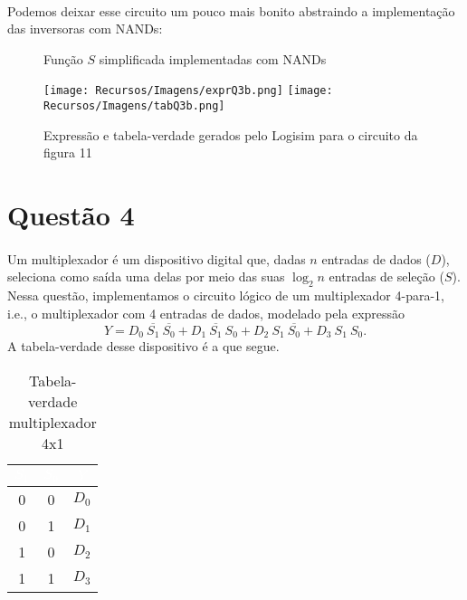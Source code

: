 \documentclass[a4paper, 12pt]{article}
\begin{document}
\paragraph{}
Podemos deixar esse circuito um pouco mais bonito abstraindo a implementação das inversoras com NANDs:

\begin{figure}[H]
    \centering
    
    \vspace{-30pt}
    \caption{Função $S$ simplificada implementadas com NANDs}
    \vspace{-10pt}
\end{figure}

\begin{figure}[H]
    \centering
    \texttt{[image: Recursos/Imagens/exprQ3b.png]}
    \texttt{[image: Recursos/Imagens/tabQ3b.png]} \\
    \caption{Expressão e tabela-verdade gerados pelo Logisim para o circuito da figura 11}
    \vspace{-20pt}
\end{figure}

\section{Questão 4}
\paragraph{}
Um multiplexador é um dispositivo digital que, dadas $n$ entradas de dados ($D$), seleciona como saída uma delas por meio das suas $\log_2n$ entradas de seleção ($S$). Nessa questão, implementamos o circuito lógico de um multiplexador 4-para-1, i.e., o multiplexador com 4 entradas de dados, modelado pela expressão
\[
Y = D_0 \ \overline{S_1} \ \overline{S_0} + D_1 \ \overline{S_1} \ S_0 + D_2 \ S_1 \ \overline{S_0} + D_3 \ S_1 \ S_0.
\]
A tabela-verdade desse dispositivo é a que segue.

\begin{table}[H]
    \centering
    \begin{tabular}{|c|c|c|}
        \hline
        \rowcolor{black}
        \textcolor{white}{$S_1$} & \textcolor{white}{$S_0$} & \textcolor{white}{$Y$} \\ \hline
        0 & 0 & $D_0$ \\ \hline
        \rowcolor{lightgray}
        0 & 1 & $D_1$ \\ \hline
        1 & 0 & $D_2$ \\ \hline
        \rowcolor{lightgray}
        1 & 1 & $D_3$ \\ \hline
    \end{tabular}
    \caption{Tabela-verdade multiplexador 4x1}
\end{table}
\end{document}

